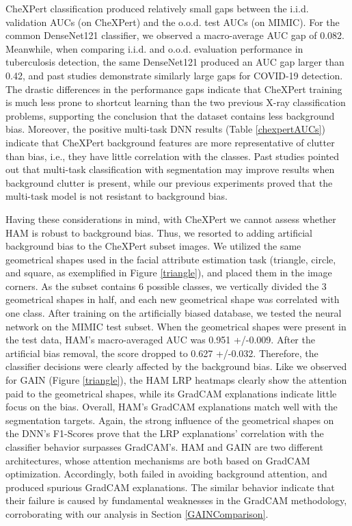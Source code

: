 \documentclass[fleqn,10pt]{wlscirep}
\begin{document}
{CheXPert classification produced relatively small gaps between the i.i.d. validation AUCs (on CheXPert) and the o.o.d. test AUCs (on MIMIC). For the common DenseNet121 classifier, we observed a macro-average AUC gap of 0.082. Meanwhile, when comparing i.i.d. and o.o.d. evaluation performance in tuberculosis detection, the same DenseNet121 produced an AUC gap larger than 0.42, and past studies demonstrate similarly large gaps for COVID-19 detection\cite{ShortcutCovid}. The drastic differences in the performance gaps indicate that CheXPert training is much less prone to shortcut learning than the two previous X-ray classification problems, supporting the conclusion that the dataset contains less background bias. Moreover, the positive multi-task DNN results (Table \ref{chexpertAUCs}) indicate that CheXPert background features are more representative of clutter than bias, i.e., they have little correlation with the classes. Past studies pointed out that multi-task classification with segmentation may improve results when background clutter is present\cite{MultiTask2}, while our previous experiments proved that the multi-task model is not resistant to background bias.

Having these considerations in mind, with CheXPert we cannot assess whether HAM is robust to background bias. Thus, we resorted to adding artificial background bias to the CheXPert subset images. We utilized the same geometrical shapes used in the facial attribute estimation task (triangle, circle, and square, as exemplified in Figure \ref{triangle}), and placed them in the image corners. As the subset contains 6 possible classes, we vertically divided the 3 geometrical shapes in half, and each new geometrical shape was correlated with one class. After training on the artificially biased database, we tested the neural network on the MIMIC test subset. When the geometrical shapes were present in the test data, HAM's macro-averaged AUC was 0.951 +/-0.009. After the artificial bias removal, the score dropped to 0.627 +/-0.032. Therefore, the classifier decisions were clearly affected by the background bias. Like we observed for GAIN (Figure \ref{triangle}), the HAM LRP heatmaps clearly show the attention paid to the geometrical shapes, while its GradCAM explanations indicate little focus on the bias. Overall, HAM's GradCAM explanations match well with the segmentation targets. Again, the strong influence of the geometrical shapes on the DNN's F1-Scores prove that the LRP explanations' correlation with the classifier behavior surpasses GradCAM's. HAM and GAIN are two different architectures, whose attention mechanisms are both based on GradCAM optimization. Accordingly, both failed in avoiding background attention, and produced spurious GradCAM explanations. The similar behavior indicate that their failure is caused by fundamental weaknesses in the GradCAM methodology, corroborating with our analysis in Section \ref{GAINComparison}.

}
\end{document}
